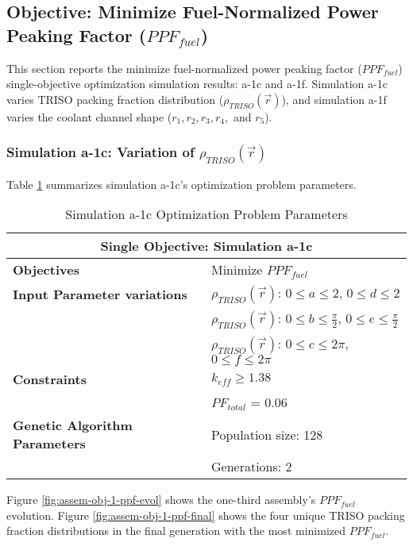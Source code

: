 \subsection{Objective: Minimize Fuel-Normalized Power Peaking Factor ($PPF_{fuel}$)}
\label{sec:assem-1-obj-ppf}
This section reports the minimize fuel-normalized power peaking factor 
($PPF_{fuel}$) single-objective optimization simulation results: a-1c and a-1f. 
Simulation a-1c varies \gls{TRISO} packing fraction distribution 
($\rho_{TRISO}(\vec{r})$), and simulation a-1f varies the coolant channel shape 
($r_1, r_2, r_3, r_4,$ and $r_5$).

\subsubsection{Simulation a-1c: Variation of $\rho_{TRISO}(\vec{r})$}
Table \ref{tab:simulationa1c} summarizes simulation a-1c's optimization problem parameters. 
\begin{table}[htbp!]
    \centering
    \onehalfspacing
    \caption{Simulation a-1c Optimization Problem Parameters}
	\label{tab:simulationa1c}
    \footnotesize
    \begin{tabular}{l|p{5.3cm}}
    \hline 
    \multicolumn{2}{c}{\textbf{Single Objective: Simulation a-1c}} \\
    \hline 
    \textbf{Objectives} & Minimize $PPF_{fuel}$ \\
    \hline 
    \textbf{Input Parameter variations}
    & $\rho_{TRISO}(\vec{r})$: $0 \leq a \leq 2$, $0 \leq d \leq 2$\\
    & $\rho_{TRISO}(\vec{r})$: $0 \leq b \leq \frac{\pi}{2}$, $0 \leq e \leq \frac{\pi}{2}$\\
    & $\rho_{TRISO}(\vec{r})$: $0 \leq c \leq 2\pi$, $0 \leq f \leq 2\pi$\\
    \hline
    \textbf{Constraints} & $k_{eff} \geq 1.38$\\ 
    & $PF_{total}$ = 0.06 \\
    \hline 
    \textbf{Genetic Algorithm Parameters} & Population size: 128 \\
    & Generations: 2 \\
    \hline
    \end{tabular}
\end{table}
Figure \ref{fig:assem-obj-1-ppf-evol} shows the one-third assembly's $PPF_{fuel}$ 
evolution. 
Figure \ref{fig:assem-obj-1-ppf-final} shows the four unique TRISO packing fraction 
distributions in the final generation with the most minimized $PPF_{fuel}$. 
